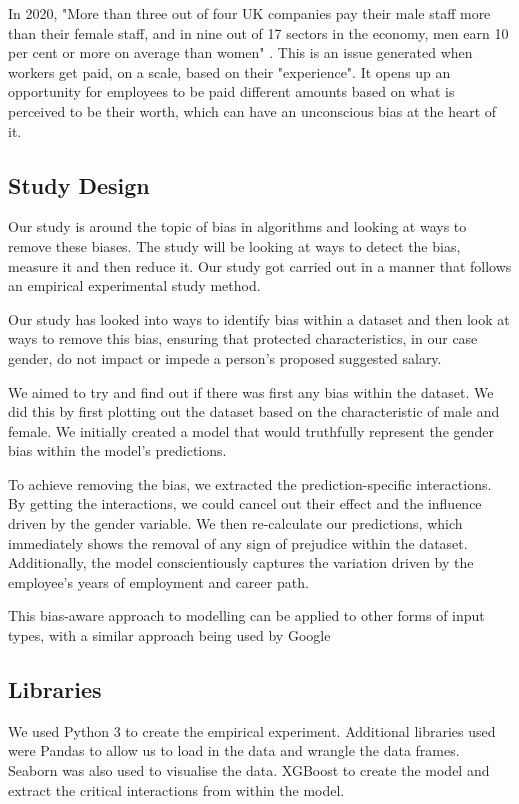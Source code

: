 \documentclass{sigchi}
\begin{document}
	
	In 2020, "More than three out of four UK companies pay their male staff more than their female staff, and in nine out of 17 sectors in the economy, men earn 10 per cent or more on average than women" \cite{gender_pay_FT}. This is an issue generated when workers get paid, on a scale, based on their "experience". It opens up an opportunity for employees to be paid different amounts based on what is perceived to be their worth, which can have an unconscious bias at the heart of it. %
	
	

\subsection{Study Design}
	Our study is around the topic of bias in algorithms and looking at ways to remove these biases. The study will be looking at ways to detect the bias, measure it and then reduce it. Our study got carried out in a manner that follows an empirical experimental study method. 

	Our study has looked into ways to identify bias within a dataset and then look at ways to remove this bias, ensuring that protected characteristics, in our case gender, do not impact or impede a person's proposed suggested salary.  

	We aimed to try and find out if there was first any bias within the dataset. We did this by first plotting out the dataset based on the characteristic of male and female. We initially created a model that would truthfully represent the gender bias within the model's predictions.

	To achieve removing the bias, we extracted the prediction-specific interactions. By getting the interactions, we could cancel out their effect and the influence driven by the gender variable. We then re-calculate our predictions, which immediately shows the removal of any sign of prejudice within the dataset. Additionally, the model conscientiously captures the variation driven by the employee's years of employment and career path. 

	This bias-aware approach to modelling can be applied to other forms of input types, with a similar approach being used by Google \cite{google_ref}

\subsection{Libraries}
	We used Python 3 \cite{python} to create the empirical experiment. Additional libraries used were Pandas \cite{pandas} to allow us to load in the data and wrangle the data frames. Seaborn \cite{seaborn} was also used to visualise the data. XGBoost \cite{xgboost} to create the model and extract the critical interactions from within the model. 
\end{document}
